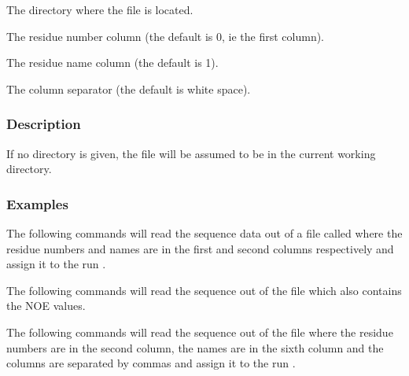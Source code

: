    The directory where the file is located.   

   The residue number column (the default is 0, ie the first column).   

   The residue name column (the default is 1).   

   The column separator (the default is white space).  

  

  
 \subsubsection{Description} 

 If no directory is given, the file will be assumed to be in the current working directory. 
  

  
 \subsubsection{Examples} 

 The following commands will read the sequence data out of a file called  where the residue numbers and names are in the first and second columns respectively and assign it to the run . 
  




 The following commands will read the sequence out of the file  which also contains the NOE values. 
  




 The following commands will read the sequence out of the file  where the residue numbers are in the second column, the names are in the sixth column and the columns are separated by commas and assign it to the run . 
  

